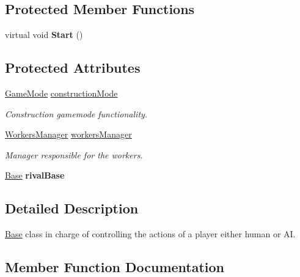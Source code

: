\subsection*{Protected Member Functions}
\begin{DoxyCompactItemize}
\item 
\mbox{\label{class_player_a1399b763f72b721482cc940aba6031df}} 
virtual void {\bfseries Start} ()
\end{DoxyCompactItemize}
\subsection*{Protected Attributes}
\begin{DoxyCompactItemize}
\item 
\mbox{\hyperlink{class_game_mode}{Game\+Mode}} \mbox{\hyperlink{class_player_a9d353d318c614a9b9bb0062728d73583}{construction\+Mode}}
\begin{DoxyCompactList}\small\item\em Construction gamemode functionality. \end{DoxyCompactList}\item 
\mbox{\hyperlink{class_workers_manager}{Workers\+Manager}} \mbox{\hyperlink{class_player_a54699f183e21ab9eee14dac9418c706b}{workers\+Manager}}
\begin{DoxyCompactList}\small\item\em Manager responsible for the workers. \end{DoxyCompactList}\item 
\mbox{\label{class_player_a04a0d92687b3fee8f7d6e3f9d3bcb2aa}} 
\mbox{\hyperlink{class_base}{Base}} {\bfseries rival\+Base}
\end{DoxyCompactItemize}


\subsection{Detailed Description}
\mbox{\hyperlink{class_base}{Base}} class in charge of controlling the actions of a player either human or AI. 



\subsection{Member Function Documentation}
\mbox{\label{class_player_a564978fc1c003f5f2e74241a6de06d78}} 
